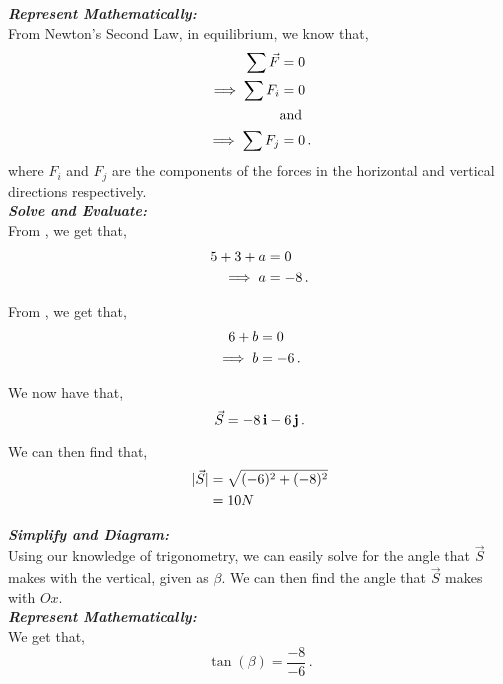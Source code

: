 \begin{subquestions}
\begin{subsubquestions}
\textbf{\textit{Represent Mathematically:}} \\
From Newton's Second Law, in equilibrium, we know that,
\begin{align}
	\sum \vec{F} & = 0 \nonumber \\
	\implies \sum F_i & = 0 \label{2010:q6:ForceI} \\
	& \text{and} \nonumber \\
	\implies \sum F_j & = 0 \label{2010:q6:ForceJ} \,.
\end{align}
where $F_i$ and $F_j$ are the components of the forces in the horizontal and vertical directions respectively.\\




\textbf{\textit{Solve and Evaluate:}} \\
From , we get that,
\begin{align}
	5+3+a & = 0 \nonumber \\
	\implies a & = -8 \,.
\end{align}

From , we get that,
\begin{align}
	6+b & = 0 \nonumber \\
	\implies b & = -6 \,.
\end{align}

We now have that,
\begin{equation}
	\vec{S} = -8\,\mathbf{i} -6\,\mathbf{j} \,.
\end{equation}

We can then find that,
\begin{align}
	|\vec{S}| & = \sqrt{(-6)^2+(-8)^2} \nonumber \\
	          & = 10N
\end{align}


\subsubquestion

\textbf{\textit{Simplify and Diagram:}} \\
Using our knowledge of trigonometry, we can easily solve for the angle that $\vec{S}$ makes with the vertical, given as $\beta$. We can then find the angle that $\vec{S}$ makes with $Ox$.\\




\textbf{\textit{Represent Mathematically:}} \\
We get that,
\begin{equation}
	\tan(\beta) = \frac{-8}{-6} \,.
\end{equation}





\end{subsubquestions}
\end{subquestions}
